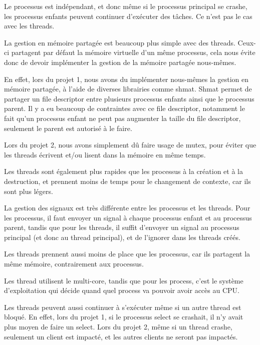 \documentclass[utf8]{article}
\begin{document}
\begin{large}
Le processus est indépendant, et donc même si le processus principal se crashe,
les processus enfants peuvent continuer d'exécuter des tâches. Ce n'est pas le
cas avec les threads.

La gestion en mémoire partagée est beaucoup plus simple avec des threads.
Ceux-ci partagent par défaut la mémoire virtuelle d'un même processus, cela nous
évite donc de devoir implémenter la gestion de la mémoire partagée nous-mêmes.
\par
En effet, lors du projet 1, nous avons du implémenter nous-mêmes la gestion en
mémoire partagée, à l'aide de diverses librairies comme shmat. Shmat permet de
partager un file descriptor entre plusieurs processus enfants ainsi que le
processus parent. Il y a eu beaucoup de contraintes avec ce file descriptor,
notamment le fait qu'un processus enfant ne peut pas augmenter la taille du file
descriptor, seulement le parent est autorisé à le faire. 
\par
Lors du projet 2, nous
avons simplement dû faire usage de mutex, pour éviter que les threads écrivent
et/ou lisent dans la mémoire en même temps.
\par
Les threads sont également plus rapides que les processus à la création et à la
destruction, et prennent moins de temps pour le changement de contexte, car ils
sont plus légers.
\par La gestion des signaux est très différente entre les
processus et les threads. Pour les processus, il faut envoyer un signal à chaque
processus enfant et au processus parent, tandis que pour les threads, il suffit
d'envoyer un signal au processus principal (et donc au thread principal), et de
l'ignorer dans les threads créés.
\par
Les threads prennent aussi moins de place que les processus, car ils partagent
la même mémoire, contrairement aux processus.
\par
Les thread utilisent le multi-core, tandis que pour les process, c'est le
système d'exploitation qui décide quand quel process va pouvoir avoir accès au
CPU.
\par
Les threads peuvent aussi continuer à s'exécuter même si un autre thread est
bloqué. En effet, lors du projet 1, si le processus select se crashait, il n'y
avait plus moyen de faire un select. Lors du projet 2, même si un thread crashe,
seulement un client est impacté, et les autres clients ne seront pas impactés.




\par

\end{large}
\end{document}
